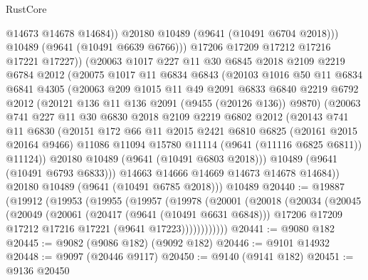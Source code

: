 \begin{lexlean}{RustCore}
\begin{coremodule}
                @14673
                @14678
                @14684))
            @20180
            @10489
            (@9641 (@10491 @6704 @2018)))
          @10489
          (@9641 (@10491 @6639 @6766)))
        @17206
        @17209
        @17212
        @17216
        @17221
        @17227))
    (@20063
      @1017
      @227
      @11
      @30
      @6845
      @2018
      @2109
      @2219
      @6784
      @2012
      (@20075
        @1017
        @11
        @6834
        @6843
        (@20103
          @1016
          @50
          @11
          @6834
          @6841
          @4305
          (@20063
            @209
            @1015
            @11
            @49
            @2091
            @6833
            @6840
            @2219
            @6792
            @2012
            (@20121 @136 @11 @136 @2091 (@9455 (@20126 @136)) @9870)
            (@20063
              @741
              @227
              @11
              @30
              @6830
              @2018
              @2109
              @2219
              @6802
              @2012
              (@20143
                @741
                @11
                @6830
                (@20151
                  @172
                  @66
                  @11
                  @2015
                  @2421
                  @6810
                  @6825
                  (@20161 @2015 @20164 @9466)
                  @11086
                  @11094
                  @15780
                  @11114
                  (@9641 (@11116 @6825 @6811))
                  @11124))
              @20180
              @10489
              (@9641 (@10491 @6803 @2018)))
            @10489
            (@9641 (@10491 @6793 @6833)))
          @14663
          @14666
          @14669
          @14673
          @14678
          @14684))
      @20180
      @10489
      (@9641 (@10491 @6785 @2018)))
    @10489
@20440 := @19887
    (@19912
      (@19953
        (@19955
          (@19957
            (@19978
              (@20001
                (@20018
                  (@20034
                    (@20045
                      (@20049
                        (@20061
                          (@20417 (@9641 (@10491 @6631 @6848)))
                          @17206
                          @17209
                          @17212
                          @17216
                          @17221
                          (@9641 @17223))))))))))))
@20441 := @9080 @182
@20445 := @9082 (@9086 @182) (@9092 @182)
@20446 := @9101 @14932
@20448 := @9097 (@20446 @9117)
@20450 := @9140 (@9141 @182)
@20451 := @9136 @20450

\end{coremodule}
\end{lexlean}
